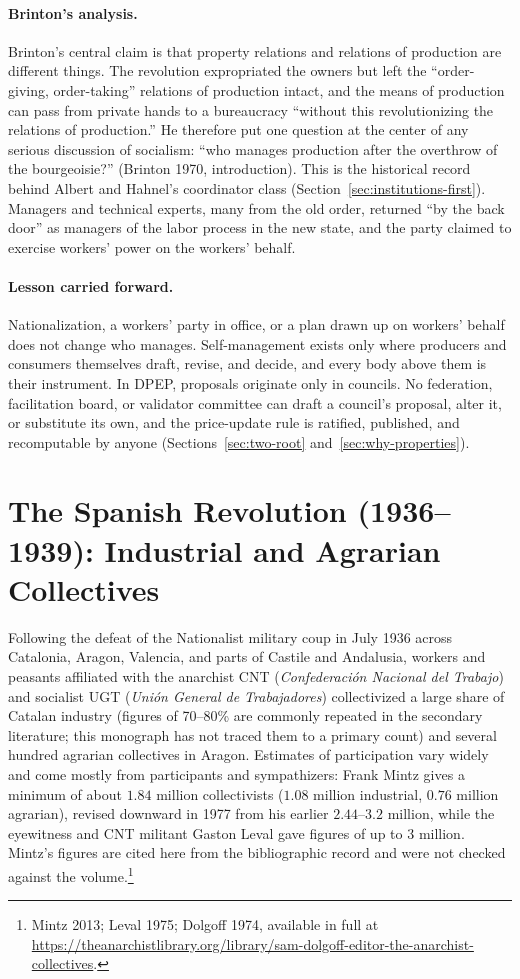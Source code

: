 \documentclass[10pt,twoside,openany]{book}
\theoremstyle{dpepstyle}
\begin{document}
\paragraph{Brinton's analysis.} Brinton's central claim is that property relations and relations of production are different things. The revolution expropriated the owners but left the ``order-giving, order-taking'' relations of production intact, and the means of production can pass from private hands to a bureaucracy ``without this revolutionizing the relations of production.'' He therefore put one question at the center of any serious discussion of socialism: ``who manages production after the overthrow of the bourgeoisie?'' (Brinton 1970, introduction). This is the historical record behind Albert and Hahnel's coordinator class (Section~\ref{sec:institutions-first}). Managers and technical experts, many from the old order, returned ``by the back door'' as managers of the labor process in the new state, and the party claimed to exercise workers' power on the workers' behalf.

\paragraph{Lesson carried forward.} Nationalization, a workers' party in office, or a plan drawn up on workers' behalf does not change who manages. Self-management exists only where producers and consumers themselves draft, revise, and decide, and every body above them is their instrument. In DPEP, proposals originate only in councils. No federation, facilitation board, or validator committee can draft a council's proposal, alter it, or substitute its own, and the price-update rule is ratified, published, and recomputable by anyone (Sections~\ref{sec:two-root} and~\ref{sec:why-properties}).

\section{The Spanish Revolution (1936--1939): Industrial and Agrarian Collectives}
\label{sec:hist-spain}

Following the defeat of the Nationalist military coup in July 1936 across Catalonia, Aragon, Valencia, and parts of Castile and Andalusia, workers and peasants affiliated with the anarchist CNT (\emph{Confederaci\'on Nacional del Trabajo}) and socialist UGT (\emph{Uni\'on General de Trabajadores}) collectivized a large share of Catalan industry (figures of 70--80\% are commonly repeated in the secondary literature; this monograph has not traced them to a primary count) and several hundred agrarian collectives in Aragon. Estimates of participation vary widely and come mostly from participants and sympathizers: Frank Mintz gives a minimum of about $1.84$ million collectivists ($1.08$ million industrial, $0.76$ million agrarian), revised downward in 1977 from his earlier $2.44$--$3.2$ million, while the eyewitness and CNT militant Gaston Leval gave figures of up to $3$ million. Mintz's figures are cited here from the bibliographic record and were not checked against the volume.\footnote{Mintz 2013; Leval 1975; Dolgoff 1974, available in full at \url{https://theanarchistlibrary.org/library/sam-dolgoff-editor-the-anarchist-collectives}.}
\end{document}
